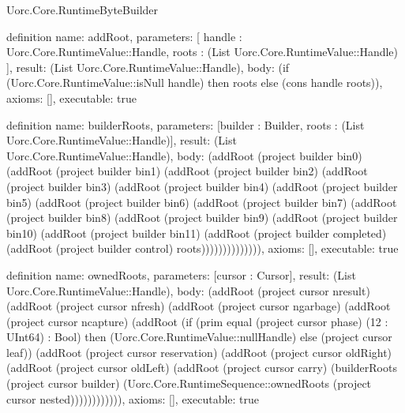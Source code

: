 \begin{lexlean}{Uorc.Core.RuntimeByteBuilder}
\begin{semanticmodule}
definition{
  name: addRoot,
  parameters: [
    handle : Uorc.Core.RuntimeValue::Handle,
    roots : (List Uorc.Core.RuntimeValue::Handle)
  ],
  result: (List Uorc.Core.RuntimeValue::Handle),
  body: (if (Uorc.Core.RuntimeValue::isNull handle) then roots else (cons handle roots)),
  axioms: [],
  executable: true
}

definition{
  name: builderRoots,
  parameters: [builder : Builder, roots : (List Uorc.Core.RuntimeValue::Handle)],
  result: (List Uorc.Core.RuntimeValue::Handle),
  body: (addRoot (project builder bin0) (addRoot (project builder bin1) (addRoot (project builder bin2) (addRoot (project builder bin3) (addRoot (project builder bin4) (addRoot (project builder bin5) (addRoot (project builder bin6) (addRoot (project builder bin7) (addRoot (project builder bin8) (addRoot (project builder bin9) (addRoot (project builder bin10) (addRoot (project builder bin11) (addRoot (project builder completed) (addRoot (project builder control) roots)))))))))))))),
  axioms: [],
  executable: true
}

definition{
  name: ownedRoots,
  parameters: [cursor : Cursor],
  result: (List Uorc.Core.RuntimeValue::Handle),
  body: (addRoot (project cursor nresult) (addRoot (project cursor nfresh) (addRoot (project cursor ngarbage) (addRoot (project cursor ncapture) (addRoot (if (prim equal (project cursor phase) (12 : UInt64) : Bool) then (Uorc.Core.RuntimeValue::nullHandle) else (project cursor leaf)) (addRoot (project cursor reservation) (addRoot (project cursor oldRight) (addRoot (project cursor oldLeft) (addRoot (project cursor carry) (builderRoots (project cursor builder) (Uorc.Core.RuntimeSequence::ownedRoots (project cursor nested)))))))))))),
  axioms: [],
  executable: true
}
\end{semanticmodule}
\end{lexlean}
